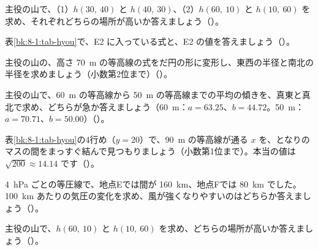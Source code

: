 \bkendproblems
{}

\bkproblem 主役の山で、（1）$h(30,\ 40)$ と $h(40,\ 30)$、（2）$h(60,\ 10)$ と $h(10,\ 60)$ を求め、それぞれどちらの場所が高いか答えましょう\mbox{（）}。

\bkproblem 表\ref{bk:8-1:tab-hyou}で、E2 に入っている式と、E2 の値を答えましょう\mbox{（）}。

\bkproblem 主役の山の、高さ \qty{70}{m} の等高線の式をだ円の形に変形し、東西の半径と南北の半径を求めましょう（小数第2位まで）\mbox{（）}。

\bkproblem 主役の山で、\qty{60}{m} の等高線から \qty{50}{m} の等高線までの平均の傾きを、真東と真北で求め、どちらが急か答えましょう（\qty{60}{m}：$a=63.25$、$b=44.72$。\qty{50}{m}：$a=70.71$、$b=50.00$）\mbox{（）}。

\bkproblem 表\ref{bk:8-1:tab-hyou}の4行め（$y=20$）で、\qty{90}{m} の等高線が通る $x$ を、となりのマスの間をまっすぐ結んで見つもりましょう（小数第1位まで）。本当の値は $\sqrt{200}\approx14.14$ です\mbox{（）}。

\bkproblem \qty{4}{hPa} ごとの等圧線で、地点Eでは間が \qty{160}{km}、地点Fでは \qty{80}{km} でした。\qty{100}{km} あたりの気圧の変化を求め、風が強くなりやすいのはどちらか答えましょう\mbox{（）}。

\bkproblem 主役の山で、$h(60,\ 10)$ と $h(10,\ 60)$ を求め、どちらの場所が高いか答えましょう\mbox{（）}。

